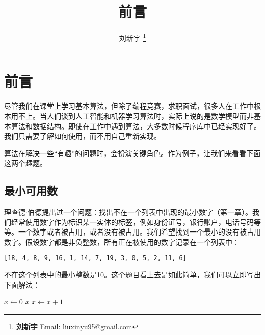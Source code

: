 \documentclass[b5paper]{ctexart}
\begin{document}

\title{前言}

\author{刘新宇
\thanks{{\bfseries 刘新宇} \newline
  Email: liuxinyu95@gmail.com \newline}
  }

\maketitle
\fi


\chapter*{前言}

尽管我们在课堂上学习基本算法，但除了编程竞赛，求职面试，很多人在工作中根本用不上。当人们谈到人工智能和机器学习算法时，实际上说的是数学模型而非基本算法和数据结构。即使在工作中遇到算法，大多数时候程序库中已经实现好了。我们只需要了解如何使用，而不用自己重新实现。

算法在解决一些“有趣”的问题时，会扮演关键角色。作为例子，让我们来看看下面这两个趣题。

\section*{最小可用数}
\label{min-free} 

理查德$\cdot$伯德提出过一个问题：找出不在一个列表中出现的最小数字（\cite{fp-pearls}第一章）。我们经常使用数字作为标识某一实体的标签，例如身份证号，银行账户，电话号码等等。一个数字或者被占用，或者没有被占用。我们希望找到一个最小的没有被占用数字。假设数字都是非负整数，所有正在被使用的数字记录在一个列表中：

\begin{verbatim}
[18, 4, 8, 9, 16, 1, 14, 7, 19, 3, 0, 5, 2, 11, 6]
\end{verbatim}

不在这个列表中的最小整数是10。这个题目看上去是如此简单，我们可以立即写出下面解法：

\begin{algorithmic}[1]
  \State $x \gets 0$
  \Loop
      \State \Return $x$
    \Else
      \State $x \gets x + 1$
    \EndIf
  \EndLoop
\EndFunction
\end{algorithmic}
\end{document}
